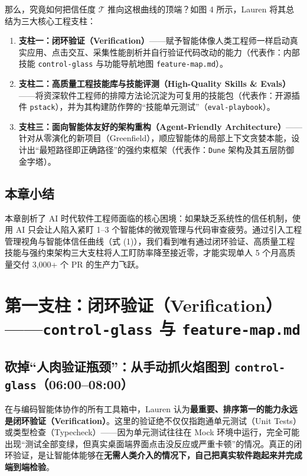 \documentclass[a4paper]{article}
\begin{document}
那么，究竟如何把信任度 $\mathcal{T}$ 推向这根曲线的顶端？如图 4 所示，Lauren 将其总结为三大核心工程支柱：
\begin{enumerate}
  \item \textbf{支柱一：闭环验证（Verification）}——赋予智能体像人类工程师一样启动真实应用、点击交互、采集性能剖析并自行验证代码改动的能力（代表作：内部技能 \texttt{control-glass} 与功能导航地图 \texttt{feature-map.md}）。
  \item \textbf{支柱二：高质量工程技能库与技能评测（High-Quality Skills \& Evals）}——将资深软件工程师的排障方法论沉淀为可复用的技能包（代表作：开源插件 \texttt{pstack}），并为其构建防作弊的“技能单元测试”（\texttt{eval-playbook}）。
  \item \textbf{支柱三：面向智能体友好的架构重构（Agent-Friendly Architecture）}——针对从零演化的新项目（Greenfield），顺应智能体的局部上下文贪婪本能，设计出“最短路径即正确路径”的强约束框架（代表作：\texttt{Dune} 架构及其五层防御金字塔）。
\end{enumerate}

\subsection{本章小结}

本章剖析了 AI 时代软件工程师面临的核心困境：如果缺乏系统性的信任机制，使用 AI 只会让人陷入紧盯 1--3 个智能体的微观管理与代码审查疲劳。通过引入工程管理视角与智能体信任曲线（式 (1)），我们看到唯有通过闭环验证、高质量工程技能与强约束架构三大支柱将人工盯防率降至接近零，才能实现单人 5 个月高质量交付 3,000+ 个 PR 的生产力飞跃。

\clearpage
\section{第一支柱：闭环验证（Verification）——\texttt{control-glass} 与 \texttt{feature-map.md}}

\subsection{砍掉“人肉验证瓶颈”：从手动抓火焰图到 \texttt{control-glass}（06:00--08:00）}

在与编码智能体协作的所有工具箱中，Lauren 认为\textbf{最重要、排序第一的能力永远是闭环验证（Verification）}。这里的验证绝不仅仅指跑通单元测试（Unit Tests）或类型检查（Typecheck）——因为单元测试往往在 Mock 环境中运行，完全可能出现“测试全部变绿，但真实桌面端界面点击没反应或严重卡顿”的情况。真正的闭环验证，是让智能体能够在\textbf{无需人类介入的情况下，自己把真实软件跑起来并完成端到端检验}。
\end{document}
